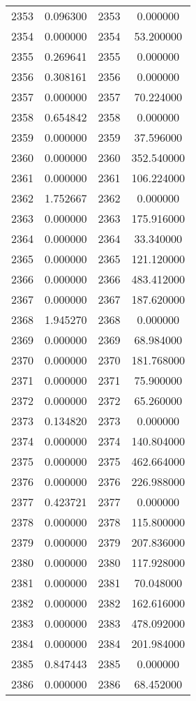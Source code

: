 \documentclass[12pt]{article}
\begin{document}
\begin{longtable}{@{}cccc@{}}
2353 & 0.096300 & 2353 & 0.000000 \\
2354 & 0.000000 & 2354 & 53.200000 \\
2355 & 0.269641 & 2355 & 0.000000 \\
2356 & 0.308161 & 2356 & 0.000000 \\
2357 & 0.000000 & 2357 & 70.224000 \\
2358 & 0.654842 & 2358 & 0.000000 \\
2359 & 0.000000 & 2359 & 37.596000 \\
2360 & 0.000000 & 2360 & 352.540000 \\
2361 & 0.000000 & 2361 & 106.224000 \\
2362 & 1.752667 & 2362 & 0.000000 \\
2363 & 0.000000 & 2363 & 175.916000 \\
2364 & 0.000000 & 2364 & 33.340000 \\
2365 & 0.000000 & 2365 & 121.120000 \\
2366 & 0.000000 & 2366 & 483.412000 \\
2367 & 0.000000 & 2367 & 187.620000 \\
2368 & 1.945270 & 2368 & 0.000000 \\
2369 & 0.000000 & 2369 & 68.984000 \\
2370 & 0.000000 & 2370 & 181.768000 \\
2371 & 0.000000 & 2371 & 75.900000 \\
2372 & 0.000000 & 2372 & 65.260000 \\
2373 & 0.134820 & 2373 & 0.000000 \\
2374 & 0.000000 & 2374 & 140.804000 \\
2375 & 0.000000 & 2375 & 462.664000 \\
2376 & 0.000000 & 2376 & 226.988000 \\
2377 & 0.423721 & 2377 & 0.000000 \\
2378 & 0.000000 & 2378 & 115.800000 \\
2379 & 0.000000 & 2379 & 207.836000 \\
2380 & 0.000000 & 2380 & 117.928000 \\
2381 & 0.000000 & 2381 & 70.048000 \\
2382 & 0.000000 & 2382 & 162.616000 \\
2383 & 0.000000 & 2383 & 478.092000 \\
2384 & 0.000000 & 2384 & 201.984000 \\
2385 & 0.847443 & 2385 & 0.000000 \\
2386 & 0.000000 & 2386 & 68.452000 \\

\end{longtable}
\end{document}
